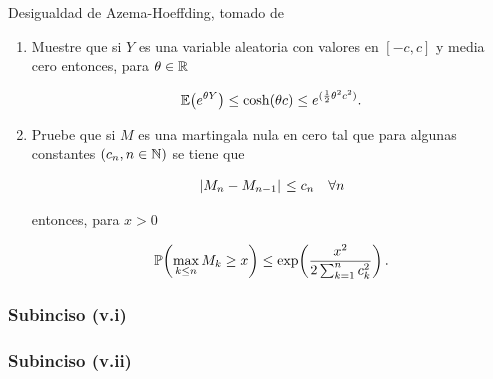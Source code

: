 Desigualdad de Azema-Hoeffding, tomado de \par
\cite[E14.2, p.237]{MR1155402}\par\null

\begin{enumerate}
    \item[(v.i)]    [\ref{problema2_3:subinciso5_1}]
         Muestre que si $Y$ es una variable aleatoria con valores en $[-c,c]$ y media cero entonces, para $\theta\in\mathbb{R}$
        
        \begin{align}
            \mathbb{E}\! \left( e^{\theta Y} \right) \leq \cosh(\theta c)\leq e^{(\frac{1}{2}\theta^2c^2)}. 
        \end{align}\par\null

    \item[(v.ii)]    [\ref{problema2_3:subinciso5_2}]
        Pruebe que si $M$ es una martingala nula en cero tal que para algunas constantes $\left( c_n,n\in\mathbb{N}\right) $ se tiene que
        
        \begin{align}
            \hspace{.25mm}\left|M_n-M_{n-1}\right|\hspace{.25mm}\leq c_n\quad\forall n
        \end{align}
        
        entonces, para $x>0$
        
        \begin{align}
            \mathbb{P}\! \left( \max_{k\leq n} M_k\geq x \right)\leq \exp\!\left( \frac{x^2}{2\sum_{k=1}^n c_k^2}\right) .
        \end{align}
\end{enumerate}
    
\subsubsection{Subinciso (v.i)}     \label{problema2_3:subinciso5_1}
    
    \newpage
    
\subsubsection{Subinciso (v.ii)}    \label{problema2_3:subinciso5_2} 
    

